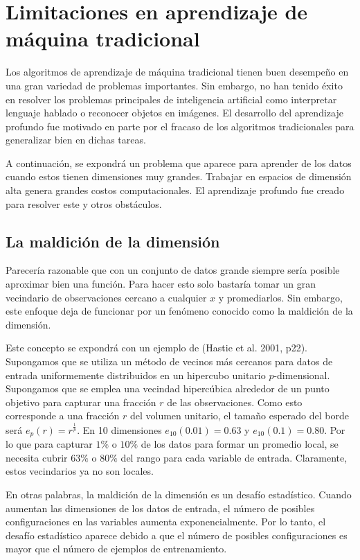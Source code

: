 \section{Limitaciones en aprendizaje de máquina tradicional}
Los algoritmos de aprendizaje de máquina tradicional tienen buen desempeño en una gran variedad de problemas importantes. Sin embargo, no han tenido éxito en resolver los problemas principales de inteligencia artificial como interpretar lenguaje hablado o reconocer objetos en imágenes. El desarrollo del aprendizaje profundo fue motivado en parte por el fracaso de los algoritmos tradicionales para generalizar bien en dichas tareas.

\vspace{1em}

A continuación, se expondrá un problema que aparece para aprender de los datos cuando estos tienen dimensiones muy grandes. Trabajar en espacios de dimensión alta genera grandes costos computacionales. El aprendizaje profundo fue creado para resolver este y otros obstáculos.
\cite{goodfellow-et-al-2016}

\subsection{La maldición de la dimensión}
Parecería razonable que con un conjunto de datos grande siempre sería posible aproximar bien una función. Para hacer esto solo bastaría tomar un gran vecindario de observaciones cercano a cualquier $x$ y promediarlos. Sin embargo, este enfoque deja de funcionar por un fenómeno conocido como la maldición de la dimensión.
\cite{Bishop:2006:PRM:1162264}
\cite{hastie01statisticallearning}
\cite{Murphy:2012:MLP:2380985}

\vspace{1em}

Este concepto se expondrá con un ejemplo de (Hastie et al. 2001, p22). Supongamos que se utiliza un método de vecinos más cercanos para datos de entrada uniformemente distribuidos en un hipercubo unitario $p$-dimensional. Supongamos que se emplea una vecindad hipercúbica alrededor de un punto objetivo para capturar una fracción $r$ de las observaciones. Como esto corresponde a una fracción $r$ del volumen unitario, el tamaño esperado del borde será $e_p(r) = r^{\frac{1}{p}}$. En 10 dimensiones $e_10(0.01)=0.63$ y $e_10(0.1) = 0.80$. Por lo que para capturar $1\%$ o $10\%$ de los datos para formar un promedio local, se necesita cubrir $63\%$ o $80\%$ del rango para cada variable de entrada. Claramente, estos vecindarios ya no son locales. \cite{hastie01statisticallearning}

\vspace{1em}

En otras palabras, la maldición de la dimensión es un desafío estadístico. Cuando aumentan las dimensiones de los datos de entrada, el número de posibles configuraciones en las variables aumenta exponencialmente. Por lo tanto, el desafío estadístico aparece debido a que el número de posibles configuraciones es mayor que el número de ejemplos de entrenamiento.
\cite{goodfellow-et-al-2016}


